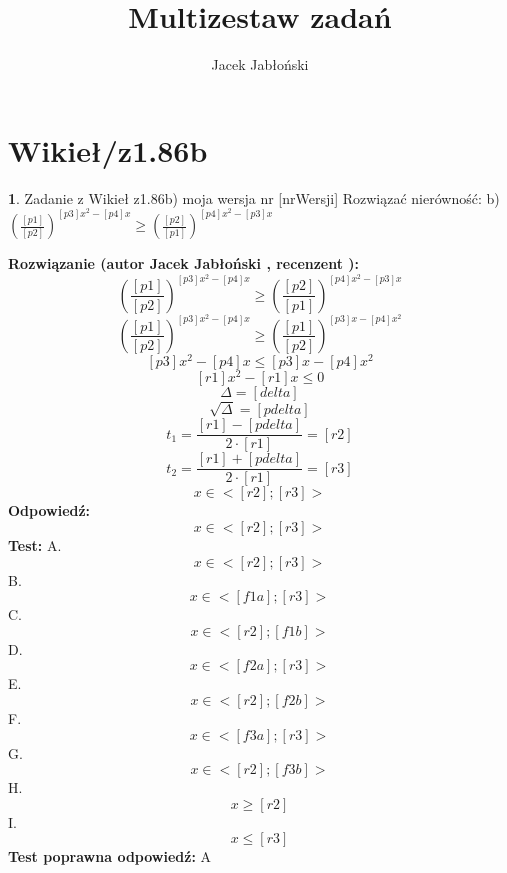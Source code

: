 \documentclass[12pt, a4paper]{article}
\title{Multizestaw zadań}
\author{Jacek Jabłoński}
\date{}
\theoremstyle{definition} %
\newtheorem{zad}{}
\newcommand{\kategoria}[1]{\section{#1}} %
\newcommand{\zadStart}[1]{\begin{zad}#1\newline} %
\newcommand{\zadStop}{\end{zad}}   %
\newcommand{\rozwStart}[2]{\noindent \textbf{Rozwiązanie (autor #1 , recenzent #2): }\newline} %
\newcommand{\rozwStop}{\newline}                                            %
\newcommand{\odpStart}{\noindent \textbf{Odpowiedź:}\newline}    %
\newcommand{\odpStop}{\newline}                                             %
\newcommand{\testStart}{\noindent \textbf{Test:}\newline} %
\newcommand{\testStop}{\newline} %
\newcommand{\kluczStart}{\noindent \textbf{Test poprawna odpowiedź:}\newline} %
\newcommand{\kluczStop}{\newline} %
\begin{document}
\maketitle


\kategoria{Wikieł/z1.86b}
\zadStart{Zadanie z Wikieł z1.86b) moja wersja nr [nrWersji]}
Rozwiązać nierówność:
b) $(\frac{[p1]}{[p2]})^{[p3]x^2-[p4]x} \geq (\frac{[p2]}{[p1]})^{[p4]x^2-[p3]x} $
\zadStop
\rozwStart{Jacek Jabłoński}{}
$$(\frac{[p1]}{[p2]})^{[p3]x^2-[p4]x} \geq (\frac{[p2]}{[p1]})^{[p4]x^2-[p3]x}$$
$$(\frac{[p1]}{[p2]})^{[p3]x^2-[p4]x} \geq (\frac{[p1]}{[p2]})^{[p3]x-[p4]x^2}$$
$$[p3]x^2-[p4]x \leq [p3]x-[p4]x^2 $$
$$[r1]x^2 - [r1]x \leq 0 $$
$$\Delta=[delta]$$
$$\sqrt{\Delta} = [pdelta]$$
$$t_1=\frac{[r1]-[pdelta]}{2 \cdot [r1]} = [r2]$$
$$t_2=\frac{[r1]+[pdelta]}{2 \cdot [r1]} = [r3]$$ 
$$x \in <[r2] ; [r3]>$$
\rozwStop
\odpStart
$$x \in <[r2] ; [r3]>$$
\odpStop
\testStart
A. $$x \in <[r2] ; [r3]>$$
B. $$x \in <[f1a] ; [r3]>$$
C. $$x \in <[r2] ; [f1b]>$$
D. $$x \in <[f2a] ; [r3]>$$
E. $$x \in <[r2] ; [f2b]>$$
F. $$x \in <[f3a] ; [r3]>$$
G. $$x \in <[r2] ; [f3b]>$$
H. $$x \geq [r2]$$
I.$$x \leq [r3]$$
\testStop
\kluczStart
A
\kluczStop
\end{document}

